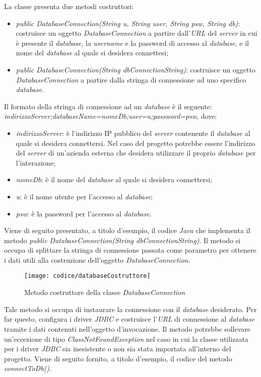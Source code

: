La classe presenta due metodi costruttori:
\begin{itemize}
	\item \textit{public DatabaseConnection(String u, String user, String psw, String db)}: costruisce un oggetto \textit{DatabaseConnection} a partire dall'\textit{URL} del \textit{server} in cui è presente il \textit{database}, la \textit{username} e la password di accesso al \textit{database}, e il nome del \textit{database} al quale si desidera connettesi;
	\item \textit{public DatabaseConnection(String dbConnectionString)}: costruisce un oggetto \textit{DatabaseConnection} a partire dalla stringa di connessione ad uno specifico \textit{database}.
\end{itemize}
Il formato della stringa di connessione ad un \textit{database} è il seguente: \textit{indirizzoServer;databaseName=nomeDb;user=u;password=psw}, dove:
\begin{itemize}
	\item \textit{indirizzoServer}: è l'indirizzo IP pubblico del \textit{server} contenente il \textit{database} al quale si desidera connettersi. Nel caso del progetto potrebbe essere l'indirizzo del \textit{server} di un'azienda esterna che desidera utilizzare il proprio \textit{database} per l'interazione;
	\item \textit{nomeDb}: è il nome del \textit{database} al quale si desidera connettersi;
	\item \textit{u}: è il nome utente per l'accesso al \textit{database};
	\item \textit{psw}: è la password per l'accesso al \textit{database}.
\end{itemize}
Viene di seguito presentato, a titolo d'esempio, il codice \textit{Java} che implementa il metodo \textit{public DatabaseConnection(String dbConnectionString)}. Il metodo si occupa di splittare la stringa di connessione passata come parametro per ottenere i dati utili alla costruzione dell'oggetto \textit{DatabaseConnection}.

\begin{figure}[!h] 
    \centering 
    \texttt{[image: codice/databaseCostruttore]} 
    \caption{Metodo costruttore della classe \textit{DatabaseConnection}}
\end{figure}


Tale metodo si occupa di instaurare la connessione con il \textit{database} desiderato. Per far questo, configura i driver \textit{JDBC} e costruisce l'\textit{URL} di connessione al \textit{database} tramite i dati contenuti nell'oggetto d'invocazione. Il metodo potrebbe sollevare un'eccezione di tipo \textit{ClassNotFoundException} nel caso in cui la classe utilizzata per i driver \textit{JDBC} sia inesistente o non sia stata importata all'interno del progetto. Viene di seguito fornito, a titolo d'esempio, il codice del metodo \textit{connectToDb()}.


